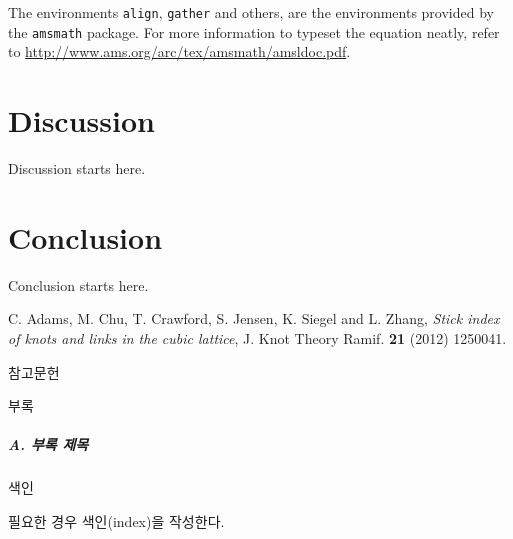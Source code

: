 \documentclass[11pt]{report}
\theoremstyle{plain}
\theoremstyle{definition}
\theoremstyle{corollary}
\theoremstyle{definition}
\theoremstyle{plain}
\theoremstyle{definition}
\theoremstyle{plain}
\begin{document}
The environments \texttt{align}, \texttt{gather} and others, are the environments provided by the \texttt{amsmath} package.
For more information to typeset the equation neatly, refer to \url{http://www.ams.org/arc/tex/amsmath/amsldoc.pdf}.

\chapter{Discussion}\label{chap:discussion}
Discussion starts here.

\chapter{Conclusion}\label{chap:conclusion}
Conclusion starts here. 


\newpage
\renewcommand\bibname{Reference(or Bibliography)}
\begin{thebibliography}{AA}
 C. Adams, M. Chu, T. Crawford, S. Jensen, K. Siegel and L. Zhang,
    {\em Stick index of knots and links in the cubic lattice},
    J. Knot Theory Ramif. \textbf{21} (2012) 1250041.



\end{thebibliography}
\begin{center}
\large
참고문헌
\end{center}
\normalsize
%
%
%
\newpage
\begin{center}
\large
부록
\end{center}
\normalsize
\paragraph{A. 부록 제목}



\newpage
\begin{center}
\large
색인

\end{center}
\normalsize
필요한 경우 색인(index)을 작성한다.
\end{document}
